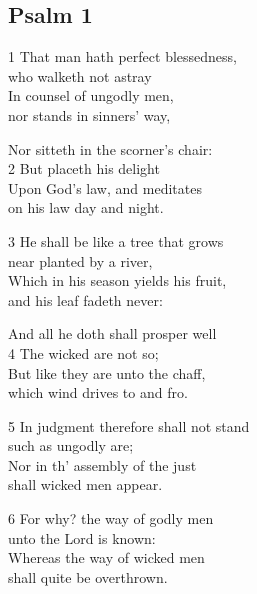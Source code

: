 \newpage

\begin{center}
\Large{}
\end{center}
\begin{multicols}{3}



\subsection*{Psalm 1 }


1 That man hath perfect blessedness,\\
who walketh not astray\\
In counsel of ungodly men,\\
nor stands in sinners’ way,

Nor sitteth in the scorner’s chair:\\
2 But placeth his delight\\
Upon God’s law, and meditates\\
on his law day and night.

3 He shall be like a tree that grows\\
near planted by a river,\\
Which in his season yields his fruit,\\
and his leaf fadeth never:

And all he doth shall prosper well\\
4 The wicked are not so;\\
But like they are unto the chaff,\\
which wind drives to and fro.

5 In judgment therefore shall not stand \\
such as ungodly are; \\
Nor in th’ assembly of the just \\
shall wicked men appear.

6 For why? the way of godly men \\
unto the Lord is known:\\
Whereas the way of wicked men \\
shall quite be overthrown.

\begin{center}
\quad{}\quad{}
\end{center}


\end{multicols}
